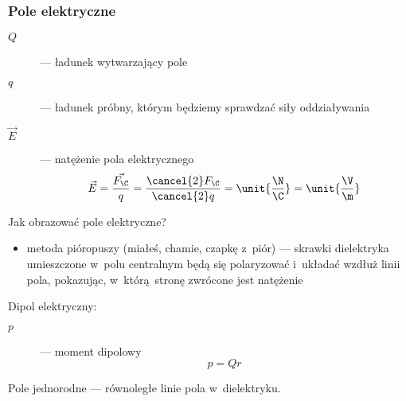 \subsubsection*{Pole elektryczne}
\begin{description}
    \item[\(Q\)] --- ładunek wytwarzający pole
    \item[\(q\)] --- ładunek próbny, którym będziemy sprawdzać siły oddziaływania
    \item[\(\vec{E}\)] --- natężenie pola elektrycznego
        \begin{equation*}
            \vec{E}
                = \frac{\vec{F_\C}}{q}
                = \frac{\cancel{2}F_\C}{\cancel{2}q}
                = \unit{\frac{\N}{\C}}
                = \unit{\frac{\V}{\m}}
        \end{equation*}
\end{description}
Jak obrazować pole elektryczne?
\begin{itemize}
    \item metoda pióropuszy (miałeś, chamie, czapkę z~piór) --- skrawki dielektryka umieszczone w~polu centralnym będą się polaryzować i~układać wzdłuż linii pola, pokazując, w~którą stronę zwrócone jest natężenie
\end{itemize}
Dipol elektryczny:
\begin{description}
    \item[\(p\)] --- moment dipolowy
        \begin{equation*}
            p = Qr
        \end{equation*}
\end{description}
Pole jednorodne --- równoległe linie pola w~dielektryku.
